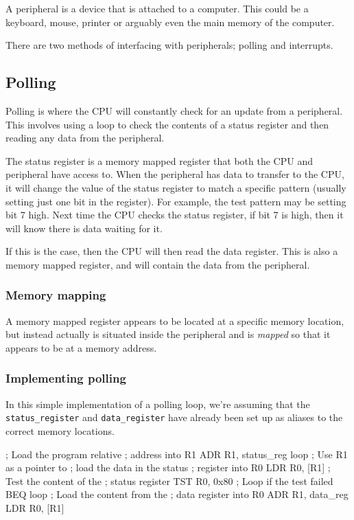 A peripheral is a device that is attached to a computer. This could be a
keyboard, mouse, printer or arguably even the main memory of the computer.

There are two methods of interfacing with peripherals; polling and interrupts.

\subsection{Polling}

Polling is where the CPU will constantly check for an update from a peripheral.
This involves using a loop to check the contents of a status register and then
reading any data from the peripheral.

The status register is a memory mapped register that both the CPU and peripheral
have access to. When the peripheral has data to transfer to the CPU, it will
change the value of the status register to match a specific pattern (usually
setting just one bit in the register). For example, the test pattern may be
setting bit 7 high. Next time the CPU checks the status register, if bit 7 is
high, then it will know there is data waiting for it.

If this is the case, then the CPU will then read the data register. This is also
a memory mapped register, and will contain the data from the peripheral.

\subsubsection{Memory mapping}
A memory mapped register appears to be located at a specific memory location,
but instead actually is situated inside the peripheral and is {\it mapped} so
that it appears to be at a memory address.

\subsubsection{Implementing polling}

In this simple implementation of a polling loop, we're assuming that the {\tt
status\_register} and {\tt data\_register} have already been set up as aliases
to the correct memory locations.

\begin{listing}{1}
	; Load the program relative
	; address into R1
	ADR	R1, status_reg
loop
	; Use R1 as a pointer to
	; load the data in the status
	; register into R0
	LDR	R0, [R1]
	; Test the content of the
	; status register
	TST	R0, 0x80
	; Loop if the test failed
	BEQ	loop
	; Load the content from the
	; data register into R0
	ADR	R1, data_reg
	LDR	R0, [R1]
\end{listing}

